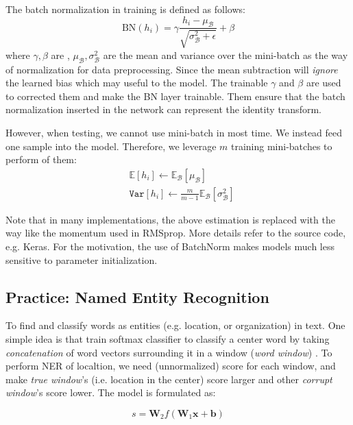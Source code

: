 The batch normalization in training is defined as follows:
\begin{equation}
\text{BN}(h_i) = \gamma \frac{h_i - \mu_{\mathcal{B}}}{\sqrt{\sigma_{\mathcal{B}}^2 + \epsilon}} + \beta
\end{equation}
where $\gamma, \beta$ are , $\mu_{\mathcal{B}}, \sigma_{\mathcal{B}}^2$ are the mean and variance over the mini-batch as the way of normalization for data preprocessing.
Since the mean subtraction will \emph{ignore} the learned bias which may useful to the model.
The trainable $\gamma$ and $\beta$ are used to corrected them and make the BN layer trainable.
Them ensure that the batch normalization inserted in the network can represent the identity transform.

However, when testing, we cannot use mini-batch in most time.
We instead feed one sample into the model.
Therefore, we leverage $m$ training mini-batches to perform  of them:
\begin{align}
&\mathbb{E}[h_i] \leftarrow \mathbb{E}_{\mathcal{B}}[\mu_{\mathcal{B}}] \nonumber \\
&\texttt{Var}[h_i] \leftarrow \frac{m}{m-1} \mathbb{E}_{\mathcal{B}}[\sigma_{\mathcal{B}}^2] \nonumber
\end{align}

Note that in many implementations, the above estimation is replaced with the way like the momentum used in RMSprop.
More details refer to the source code, e.g. Keras.
For the motivation, the use of BatchNorm makes models much less sensitive to parameter initialization.

\subsection{Practice: Named Entity Recognition}
To find and classify words as entities (e.g. location, or organization) in text.
One simple idea is that train softmax classifier to classify a center word by taking
\emph{concatenation} of word vectors surrounding it in a window (\emph{word window}) .
To perform NER of localtion, we need (unnormalized) score for each window, and make \emph{true window}’s (i.e. location in the center) score larger and other \emph{corrupt window}’s score lower.
The model is formulated as:

\begin{equation}
s = \bm{W}_2 f(\bm{W}_1 \bm{x} + \bm{b})
\end{equation}


